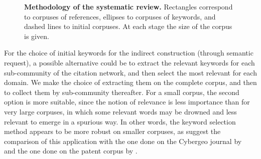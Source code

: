 \documentclass[10pt]{article}
\begin{document}
\begin{figure}
\begin{center}
\end{center}
\caption{\textbf{Methodology of the systematic review.} Rectangles correspond to corpuses of references, ellipses to corpuses of keywords, and dashed lines to initial corpuses. At each stage the size of the corpus is given.\label{fig:modelography:systematicreview}}
\end{figure}



For the choice of initial keywords for the indirect construction (through semantic request), a possible alternative could be to extract the relevant keywords for each sub-community of the citation network, and then select the most relevant for each domain. We make the choice of extracting them on the complete corpus, and then to collect them by sub-community thereafter. For a small corpus, the second option is more suitable, since the notion of relevance is less importance than for very large corpuses, in which some relevant words may be drowned and less relevant to emerge in a spurious way. In other words, the keyword selection method appears to be more robust on smaller corpuses, as suggest the comparison of this application with the one done on the Cybergeo journal by~\cite{raimbault2019exploration} and the one done on the patent corpus by \cite{bergeaud2017classifying}.
\end{document}
